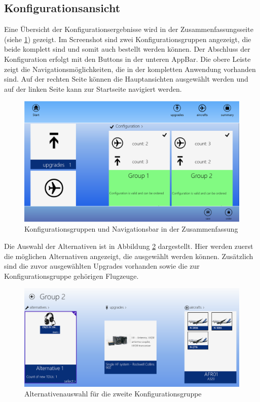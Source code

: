 \subsection{Konfigurationsansicht}
Eine Übersicht der Konfigurationsergebnisse wird in der Zusammenfassungsseite (siehe \ref{configurationResultImpl}) gezeigt. Im Screenshot sind zwei Konfigurationsgruppen angezeigt, die beide komplett sind und somit auch bestellt werden können. Der Abschluss der Konfiguration erfolgt mit den Buttons in der unteren AppBar. Die obere Leiste zeigt die Navigationsmöglichkeiten, die in der kompletten Anwendung vorhanden sind. Auf der rechten Seite können die Hauptansichten ausgewählt werden und auf der linken Seite kann zur Startseite navigiert werden. \par 
\begin{figure}[H]
\centering
\includegraphics[width=\hsize]{images/impl/app_bar_impl}
\caption{Konfigurationsgruppen und Navigationsbar in der Zusammenfassung}
\label{configurationResultImpl}
\end{figure}
Die Auswahl der Alternativen ist in Abbildung \ref{alternativeSelectionImpl} dargestellt. Hier werden zuerst die möglichen Alternativen angezeigt, die ausgewählt werden können. Zusätzlich sind die zuvor ausgewählten Upgrades vorhanden sowie die zur Konfigurationsgruppe gehörigen Flugzeuge. 
\begin{figure}[H]
\centering
\includegraphics[width=\hsize]{images/impl/alternative_impl}
\caption{Alternativenauswahl für die zweite Konfigurationsgruppe}
\label{alternativeSelectionImpl}
\end{figure}

 
